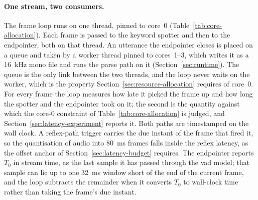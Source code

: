 \paragraph{One stream, two consumers.} The frame loop runs on one thread, pinned to core~0
(Table~\ref{tab:core-allocation}). Each frame is passed to the keyword spotter and then to the
endpointer, both on that thread. An utterance the endpointer closes is placed on a queue and taken
by a worker thread pinned to cores~1--3, which writes it as a 16~kHz mono file and runs the parse
path on it (Section~\ref{sec:runtime}). The queue is the only link between the two threads, and the
loop never waits on the worker, which is the property Section~\ref{sec:resource-allocation}
requires of core~0. For every frame the loop measures how late it picked the frame up and how long
the spotter and the endpointer took on it; the second is the quantity against which the core-0
constraint of Table~\ref{tab:core-allocation} is judged, and Section~\ref{sec:latency-experiment}
reports it. Both paths are timestamped on the wall clock. A reflex-path trigger carries the due
instant of the frame that fired it, so the quantisation of audio into 80~ms frames falls inside
the reflex latency, as the offset anchor of Section~\ref{sec:latency-budget} requires. The
endpointer reports $T_0$ in stream time, as the last sample it has passed through the \gls{vad}
model; that sample can lie up to one 32~ms window short of the end of the current frame, and the
loop subtracts the remainder when it converts $T_0$ to wall-clock time rather than taking the
frame's due instant.

